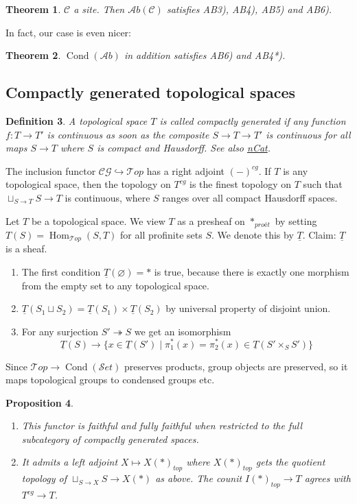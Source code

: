 \documentclass[12pt]{article}
\theoremstyle{darkgreentheorem}
\newtheorem{thm}{Theorem}
\newtheorem{prop}[thm]{Proposition}
\theoremstyle{darkbluedefinition}
\newtheorem{defn}[thm]{Definition}
\theoremstyle{darkredexample}
\theoremstyle{remark}
\newcommand{\1}{\mathbbm{1}}
\newcommand{\scrC}{\mathscr{C}}
\newcommand{\Top}{\mathscr{T}op}
\newcommand{\CG}{\mathscr{CG}}
\newcommand{\Ab}{\mathscr{A}b}
\newcommand{\Set}{\mathscr{S}et}
\DeclareMathOperator{\Hom}{Hom}
\DeclareMathOperator{\Cond}{Cond}
\newcommand{\pe}{*_{proét}}
\renewcommand{\u}[1]{\underline{#1}}
\newcommand{\fp}[1]{\times_{#1}}
\begin{document}
\begin{thm}
    $\scrC$ a site. Then $\Ab(\scrC)$ satisfies AB3), AB4), AB5) and AB6).
\end{thm}

In fact, our case is even nicer:

\begin{thm}
    $\Cond(\Ab)$ in addition satisfies AB6) and AB4*).
\end{thm}

\subsection{Compactly generated topological spaces}

\begin{defn}
    A topological space $T$ is called \textit{compactly generated} if any function $f\colon T\to T'$ is continuous as soon as the composite $S\to T\to T'$ is continuous for all maps $S\to T$ where $S$ is compact and Hausdorff.
    See also \href{https://ncatlab.org/nlab/show/compactly+generated+topological+space}{nCat}.
\end{defn}

The inclusion functor $\CG \hookrightarrow \Top$ has a right adjoint $(-)^{cg}$.
If $T$ is any topological space, then the topology on $T^{cg}$ is the finest topology on $T$ such that $\sqcup_{S\to T}S\to T$ is continuous, where $S$ ranges over all compact Hausdorff spaces.

Let $T$ be a topological space.
We view $T$ as a presheaf on $\pe$ by setting $T(S)=\Hom_{\Top}(S,T)$ for all profinite sets $S$.
We denote this by $\u{T}$.
Claim: $\u{T}$ is a sheaf.
\begin{enumerate}[label=\roman*)]
    \item The first condition $\u{T}(\varnothing)=*$ is true, because there is exactly one morphism from the empty set to any topological space.
    \item $\u{T}(S_{1}\sqcup S_{2})=\u{T}(S_{1})\times \u{T}(S_{2})$ by universal property of disjoint union.
    \item For any surjection $S'\twoheadrightarrow S$ we get an isomorphism
	\[ \u{T}(S)\to \{ x\in \u{T}(S')\mid \pi_{1}^{*}(x)=\pi_{2}^{*}(x)\in \u{T}(S'\fp{S}S')\}\]
\end{enumerate}

Since $\Top\to \Cond(\Set)$ preserves products, group objects are preserved, so it maps topological groups to condensed groups etc.

\begin{prop}
    \begin{enumerate}[label=\roman*)]
	\item This functor is faithful and fully faithful when restricted to the full subcategory of compactly generated spaces.
	\item It admits a left adjoint $X\mapsto X(*)_{top}$ where $X(*)_{top}$ gets the quotient topology of $\sqcup_{S\to X}S\to X(*)$ as above.
	    The counit $I(*)_{top}\to T$ agrees with $T^{cg}\to T$.
    \end{enumerate}
\end{prop}
\end{document}
